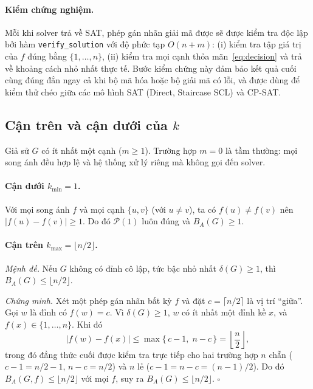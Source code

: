 \documentclass[a4paper,fleqn]{cas-sc}
\begin{document}
\paragraph{Kiểm chứng nghiệm.} Mỗi khi solver trả về SAT, phép gán nhãn giải mã được sẽ được kiểm tra độc lập bởi hàm \texttt{verify\_solution} với độ phức tạp $O(n + m)$: (i) kiểm tra tập giá trị của $f$ đúng bằng $\{1, \dots, n\}$, (ii) kiểm tra mọi cạnh thỏa mãn~\eqref{eq:decision} và trả về khoảng cách nhỏ nhất thực tế. Bước kiểm chứng này đảm bảo kết quả cuối cùng đúng đắn ngay cả khi bộ mã hóa hoặc bộ giải mã có lỗi, và được dùng để kiểm thử chéo giữa các mô hình SAT (Direct, Staircase SCL) và CP-SAT.

\subsection{Cận trên và cận dưới của $k$}
\label{sec:bounds}
Giả sử $G$ có ít nhất một cạnh ($m \ge 1$). Trường hợp $m = 0$ là tầm thường: mọi song ánh đều hợp lệ và hệ thống xử lý riêng mà không gọi đến solver.

\paragraph{Cận dưới $k_{\min} = 1$.} Với mọi song ánh $f$ và mọi cạnh $\{u, v\}$ (với $u \ne v$), ta có $f(u) \ne f(v)$ nên $|f(u) - f(v)| \ge 1$. Do đó $\mathcal{P}(1)$ luôn đúng và $B_A(G) \ge 1$.

\paragraph{Cận trên $k_{\max} = \lfloor n/2 \rfloor$.} \textit{Mệnh đề.} Nếu $G$ không có đỉnh cô lập, tức bậc nhỏ nhất $\delta(G) \ge 1$, thì $B_A(G) \le \lfloor n/2 \rfloor$.

\textit{Chứng minh.} Xét một phép gán nhãn bất kỳ $f$ và đặt $c = \lceil n/2 \rceil$ là vị trí ``giữa''. Gọi $w$ là đỉnh có $f(w) = c$. Vì $\delta(G) \ge 1$, $w$ có ít nhất một đỉnh kề $x$, và $f(x) \in \{1, \dots, n\}$. Khi đó
\begin{equation}
|f(w) - f(x)| \le \max\{\, c - 1,\; n - c \,\} = \left\lfloor \frac{n}{2} \right\rfloor,
\end{equation}
trong đó đẳng thức cuối được kiểm tra trực tiếp cho hai trường hợp $n$ chẵn ($c - 1 = n/2 - 1$, $n - c = n/2$) và $n$ lẻ ($c - 1 = n - c = (n-1)/2$). Do đó $B_A(G, f) \le \lfloor n/2 \rfloor$ với mọi $f$, suy ra $B_A(G) \le \lfloor n/2 \rfloor$. \hfill$\square$
\end{document}
